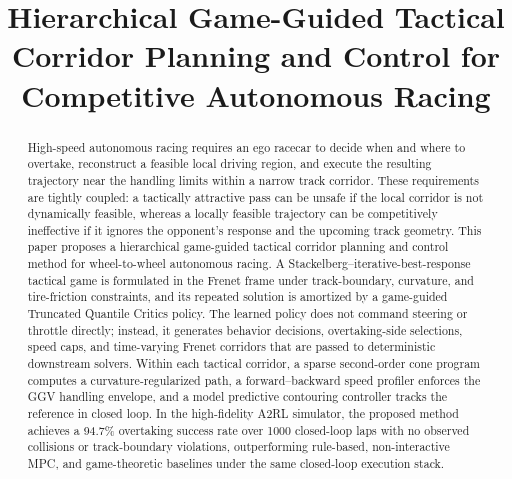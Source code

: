 \documentclass{iopjournal}
\begin{document}

\title{Hierarchical Game-Guided Tactical Corridor Planning and Control for Competitive Autonomous Racing}




\begin{abstract}

High-speed autonomous racing requires an ego racecar to decide when and where
to overtake, reconstruct a feasible local driving region, and execute the
resulting trajectory near the handling limits within a narrow track corridor.
These requirements are tightly coupled: a tactically attractive pass can be
unsafe if the local corridor is not dynamically feasible, whereas a locally
feasible trajectory can be competitively ineffective if it ignores the
opponent's response and the upcoming track geometry.  This paper proposes a
hierarchical game-guided tactical corridor planning and control method for
wheel-to-wheel autonomous racing.  A Stackelberg--iterative-best-response
tactical game is formulated in the Frenet frame under track-boundary,
curvature, and tire-friction constraints, and its repeated solution is
amortized by a game-guided Truncated Quantile Critics policy.  The learned
policy does not command steering or throttle directly; instead, it generates
behavior decisions, overtaking-side selections, speed caps, and time-varying
Frenet corridors that are passed to deterministic downstream solvers.  Within
each tactical corridor, a sparse second-order cone program computes a
curvature-regularized path, a forward--backward speed profiler enforces the
GGV handling envelope, and a model predictive contouring controller tracks the
reference in closed loop.  In the high-fidelity A2RL simulator, the proposed
method achieves a 94.7\% overtaking success rate over 1000 closed-loop laps
with no observed collisions or track-boundary violations, outperforming
rule-based, non-interactive MPC, and game-theoretic baselines under the same
closed-loop execution stack.




\end{abstract}

\end{document}
